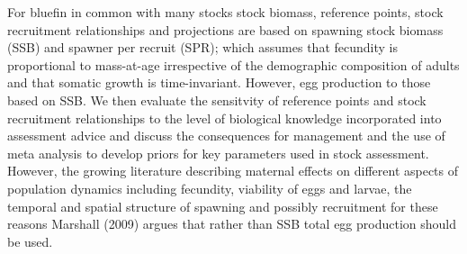 \documentclass[a4paper,10pt]{article}
\begin{document}
For bluefin in common with many stocks stock biomass, reference points,
stock recruitment relationships and projections are based on spawning stock biomass (SSB) and spawner per recruit (SPR); which assumes that fecundity is 
proportional to mass-at-age irrespective of the demographic composition of adults \cite{murawski2001impacts} and that somatic growth is
time-invariant. However, egg production to those based on SSB. We then evaluate the sensitvity of reference points and stock recruitment relationships 
to the level of biological knowledge incorporated into assessment advice and discuss the consequences for management and the use of 
meta analysis to develop priors for key parameters used in stock assessment. However, the growing literature describing maternal effects on different aspects of
population dynamics including fecundity, viability of eggs and larvae, the temporal and spatial structure of spawning and possibly recruitment for these 
reasons Marshall (2009) argues that rather than SSB total egg production should be used.



% 
  
\end{document}
